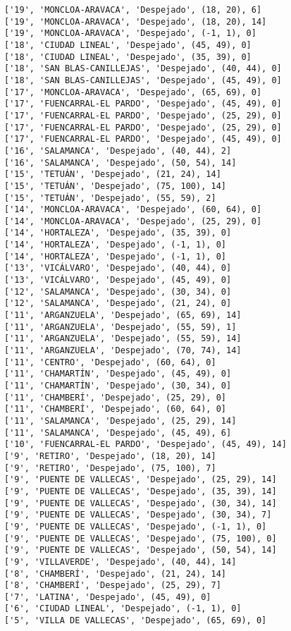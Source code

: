 \documentclass[11pt]{article}
\begin{document}
\begin{Verbatim}[commandchars=\\\{\}]
['19', 'MONCLOA-ARAVACA', 'Despejado', (18, 20), 6]
['19', 'MONCLOA-ARAVACA', 'Despejado', (18, 20), 14]
['19', 'MONCLOA-ARAVACA', 'Despejado', (-1, 1), 0]
['18', 'CIUDAD LINEAL', 'Despejado', (45, 49), 0]
['18', 'CIUDAD LINEAL', 'Despejado', (35, 39), 0]
['18', 'SAN BLAS-CANILLEJAS', 'Despejado', (40, 44), 0]
['18', 'SAN BLAS-CANILLEJAS', 'Despejado', (45, 49), 0]
['17', 'MONCLOA-ARAVACA', 'Despejado', (65, 69), 0]
['17', 'FUENCARRAL-EL PARDO', 'Despejado', (45, 49), 0]
['17', 'FUENCARRAL-EL PARDO', 'Despejado', (25, 29), 0]
['17', 'FUENCARRAL-EL PARDO', 'Despejado', (25, 29), 0]
['17', 'FUENCARRAL-EL PARDO', 'Despejado', (45, 49), 0]
['16', 'SALAMANCA', 'Despejado', (40, 44), 2]
['16', 'SALAMANCA', 'Despejado', (50, 54), 14]
['15', 'TETUÁN', 'Despejado', (21, 24), 14]
['15', 'TETUÁN', 'Despejado', (75, 100), 14]
['15', 'TETUÁN', 'Despejado', (55, 59), 2]
['14', 'MONCLOA-ARAVACA', 'Despejado', (60, 64), 0]
['14', 'MONCLOA-ARAVACA', 'Despejado', (25, 29), 0]
['14', 'HORTALEZA', 'Despejado', (35, 39), 0]
['14', 'HORTALEZA', 'Despejado', (-1, 1), 0]
['14', 'HORTALEZA', 'Despejado', (-1, 1), 0]
['13', 'VICÁLVARO', 'Despejado', (40, 44), 0]
['13', 'VICÁLVARO', 'Despejado', (45, 49), 0]
['12', 'SALAMANCA', 'Despejado', (30, 34), 0]
['12', 'SALAMANCA', 'Despejado', (21, 24), 0]
['11', 'ARGANZUELA', 'Despejado', (65, 69), 14]
['11', 'ARGANZUELA', 'Despejado', (55, 59), 1]
['11', 'ARGANZUELA', 'Despejado', (55, 59), 14]
['11', 'ARGANZUELA', 'Despejado', (70, 74), 14]
['11', 'CENTRO', 'Despejado', (60, 64), 0]
['11', 'CHAMARTÍN', 'Despejado', (45, 49), 0]
['11', 'CHAMARTÍN', 'Despejado', (30, 34), 0]
['11', 'CHAMBERÍ', 'Despejado', (25, 29), 0]
['11', 'CHAMBERÍ', 'Despejado', (60, 64), 0]
['11', 'SALAMANCA', 'Despejado', (25, 29), 14]
['11', 'SALAMANCA', 'Despejado', (45, 49), 6]
['10', 'FUENCARRAL-EL PARDO', 'Despejado', (45, 49), 14]
['9', 'RETIRO', 'Despejado', (18, 20), 14]
['9', 'RETIRO', 'Despejado', (75, 100), 7]
['9', 'PUENTE DE VALLECAS', 'Despejado', (25, 29), 14]
['9', 'PUENTE DE VALLECAS', 'Despejado', (35, 39), 14]
['9', 'PUENTE DE VALLECAS', 'Despejado', (30, 34), 14]
['9', 'PUENTE DE VALLECAS', 'Despejado', (30, 34), 7]
['9', 'PUENTE DE VALLECAS', 'Despejado', (-1, 1), 0]
['9', 'PUENTE DE VALLECAS', 'Despejado', (75, 100), 0]
['9', 'PUENTE DE VALLECAS', 'Despejado', (50, 54), 14]
['9', 'VILLAVERDE', 'Despejado', (40, 44), 14]
['8', 'CHAMBERÍ', 'Despejado', (21, 24), 14]
['8', 'CHAMBERÍ', 'Despejado', (25, 29), 7]
['7', 'LATINA', 'Despejado', (45, 49), 0]
['6', 'CIUDAD LINEAL', 'Despejado', (-1, 1), 0]
['5', 'VILLA DE VALLECAS', 'Despejado', (65, 69), 0]

\end{Verbatim}
\end{document}
